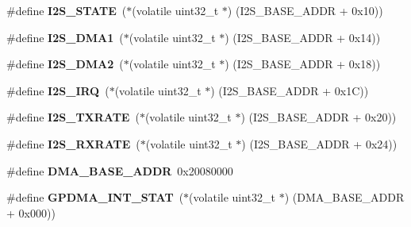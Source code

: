 \begin{DoxyCompactItemize}
\item 
\mbox{\label{group__lpc24xx__regs_ga48c1c51f31d33865579535357079de85}} 
\#define {\bfseries I2\+S\+\_\+\+S\+T\+A\+TE}~($\ast$(volatile uint32\+\_\+t $\ast$) (I2\+S\+\_\+\+B\+A\+S\+E\+\_\+\+A\+D\+DR + 0x10))
\item 
\mbox{\label{group__lpc24xx__regs_ga4675790a80f5baa97a96e32a61252ae2}} 
\#define {\bfseries I2\+S\+\_\+\+D\+M\+A1}~($\ast$(volatile uint32\+\_\+t $\ast$) (I2\+S\+\_\+\+B\+A\+S\+E\+\_\+\+A\+D\+DR + 0x14))
\item 
\mbox{\label{group__lpc24xx__regs_ga10ade59017149a53a56d2007b2e0992a}} 
\#define {\bfseries I2\+S\+\_\+\+D\+M\+A2}~($\ast$(volatile uint32\+\_\+t $\ast$) (I2\+S\+\_\+\+B\+A\+S\+E\+\_\+\+A\+D\+DR + 0x18))
\item 
\mbox{\label{group__lpc24xx__regs_gad976ba11a99acd1a594ea0062b058641}} 
\#define {\bfseries I2\+S\+\_\+\+I\+RQ}~($\ast$(volatile uint32\+\_\+t $\ast$) (I2\+S\+\_\+\+B\+A\+S\+E\+\_\+\+A\+D\+DR + 0x1\+C))
\item 
\mbox{\label{group__lpc24xx__regs_gaf5033b62b35f216b1dcef051c576432c}} 
\#define {\bfseries I2\+S\+\_\+\+T\+X\+R\+A\+TE}~($\ast$(volatile uint32\+\_\+t $\ast$) (I2\+S\+\_\+\+B\+A\+S\+E\+\_\+\+A\+D\+DR + 0x20))
\item 
\mbox{\label{group__lpc24xx__regs_ga182c48a306ab18548f3f3c107c5b3a1e}} 
\#define {\bfseries I2\+S\+\_\+\+R\+X\+R\+A\+TE}~($\ast$(volatile uint32\+\_\+t $\ast$) (I2\+S\+\_\+\+B\+A\+S\+E\+\_\+\+A\+D\+DR + 0x24))
\item 
\mbox{\label{group__lpc24xx__regs_ga201c775905e9f952b24eab2e2d74cc30}} 
\#define {\bfseries D\+M\+A\+\_\+\+B\+A\+S\+E\+\_\+\+A\+D\+DR}~0x20080000
\item 
\mbox{\label{group__lpc24xx__regs_ga9b2edef4fba6f1e806b16e6f5f3ec427}} 
\#define {\bfseries G\+P\+D\+M\+A\+\_\+\+I\+N\+T\+\_\+\+S\+T\+AT}~($\ast$(volatile uint32\+\_\+t $\ast$) (D\+M\+A\+\_\+\+B\+A\+S\+E\+\_\+\+A\+D\+DR + 0x000))
\item 
\mbox{\label{group__lpc24xx__regs_ga4899f3e99ab39a92645e479e2f045458}} 

\end{DoxyCompactItemize}
